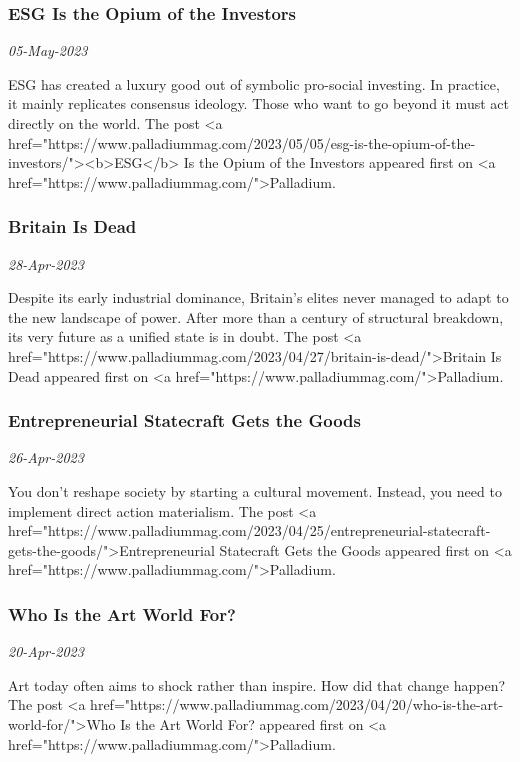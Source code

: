 \subsubsection{ESG Is the Opium of the Investors \href{https://www.palladiummag.com/2023/05/05/esg-is-the-opium-of-the-investors/}{}}
\textit{05-May-2023}

ESG has created a luxury good out of symbolic pro-social investing. In practice, it mainly replicates consensus ideology. Those who want to go beyond it must act directly on the world.
The post <a href="https://www.palladiummag.com/2023/05/05/esg-is-the-opium-of-the-investors/"><b>ESG</b> Is the Opium of the Investors
 appeared first on <a href="https://www.palladiummag.com/">Palladium.
\subsubsection{Britain Is Dead \href{https://www.palladiummag.com/2023/04/27/britain-is-dead/}{}}
\textit{28-Apr-2023}

Despite its early industrial dominance, Britain's elites never managed to adapt to the new landscape of power. After more than a century of structural breakdown, its very future as a unified state is in doubt.
The post <a href="https://www.palladiummag.com/2023/04/27/britain-is-dead/">Britain Is Dead
 appeared first on <a href="https://www.palladiummag.com/">Palladium.
\subsubsection{Entrepreneurial Statecraft Gets the Goods \href{https://www.palladiummag.com/2023/04/25/entrepreneurial-statecraft-gets-the-goods/}{}}
\textit{26-Apr-2023}

You don't reshape society by starting a cultural movement. Instead, you need to implement direct action materialism.
The post <a href="https://www.palladiummag.com/2023/04/25/entrepreneurial-statecraft-gets-the-goods/">Entrepreneurial Statecraft Gets the Goods
 appeared first on <a href="https://www.palladiummag.com/">Palladium.
\subsubsection{Who Is the Art World For? \href{https://www.palladiummag.com/2023/04/20/who-is-the-art-world-for/}{}}
\textit{20-Apr-2023}

Art today often aims to shock rather than inspire. How did that change happen?
The post <a href="https://www.palladiummag.com/2023/04/20/who-is-the-art-world-for/">Who Is the Art World For?
 appeared first on <a href="https://www.palladiummag.com/">Palladium.

